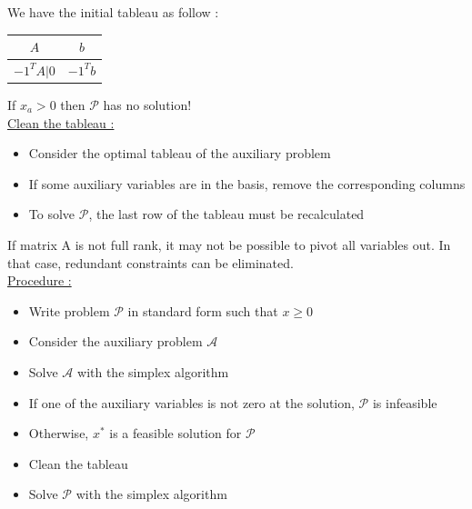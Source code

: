 \documentclass[../main.tex]{subfiles}
\begin{document}
We have the initial tableau as follow : \begin{table}[hbt!]
    \centering
    \begin{tabular}{|c|c|}
       \hline
        $A$ & $b$\\
        \hline
        $-1^TA \lvert 0$ & $-1^Tb$\\
        \hline
    \end{tabular}
\end{table}

\warning If $x_a>0$ then $\mathcal{P}$ has no solution!\\

\quad \underline{Clean the tableau :}\begin{itemize}
    \item Consider the optimal tableau of the auxiliary problem\\
    \item If some auxiliary variables are in the basis, remove the corresponding columns\\
    \item To solve $\mathcal{P}$, the last row of the tableau must be recalculated\\
\end{itemize}
If matrix A is not full rank, it may not be possible to pivot all variables out. In that case, redundant constraints can be eliminated.\\

\quad \underline{Procedure :}\begin{itemize}
    \item Write problem $\mathcal{P}$ in standard form such that $x\geq 0$\\
    \item Consider the auxiliary problem $\mathcal{A}$\\
    \item Solve $\mathcal{A}$ with the simplex algorithm\\
    \item If one of the auxiliary variables is not zero at the solution, $\mathcal{P}$ is infeasible\\
    \item Otherwise, $x^*$ is a feasible solution for $\mathcal{P}$\\
    \item Clean the tableau\\
    \item Solve $\mathcal{P}$ with the simplex algorithm\\
\end{itemize}
\end{document}
